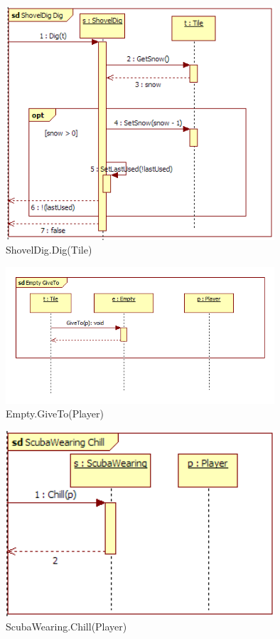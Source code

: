 \begin{figure}[H]
	\begin{center}
		\includegraphics[width=10cm]{chapters/chapter03/seqdiag/ShovelDig_Dig.png}
		\caption{ShovelDig.Dig(Tile)}
		\label{fig:ShovelDigDig}
	\end{center}
\end{figure}
\begin{figure}[H]
	\begin{center}
		\includegraphics[width=10cm]{chapters/chapter03/seqdiag/Empty_GiveTo.png}
		\caption{Empty.GiveTo(Player)}
		\label{fig:EmptyGiveTo}
	\end{center}
\end{figure}
\begin{figure}[H]
	\begin{center}
		\includegraphics[width=10cm]{chapters/chapter03/seqdiag/ScubaWearing_Chill.png}
		\caption{ScubaWearing.Chill(Player)}
		\label{fig:ScubaWearingChill}
	\end{center}
\end{figure}
